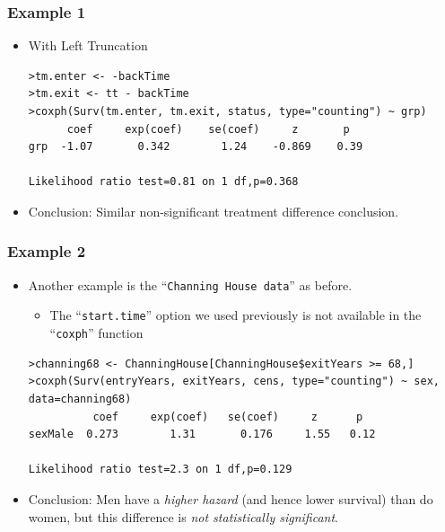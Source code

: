 \documentclass{beamer}
\newcommand{\empr}[1]{{\emph{\color{red}#1}}}
\begin{document}
\pagebreak
\begin{frame}[fragile]
\frametitle{Example 1}
\begin{itemize}
\item With {\color{red}Left Truncation}
\begin{Verbatim}
>tm.enter <- -backTime 
>tm.exit <- tt - backTime
>coxph(Surv(tm.enter, tm.exit, status, type="counting") ~ grp)
      coef     exp(coef)    se(coef)     z       p 
grp  -1.07       0.342        1.24    -0.869    0.39
	
Likelihood ratio test=0.81 on 1 df,p=0.368
\end{Verbatim}
\item Conclusion: Similar non-significant treatment difference conclusion.
\end{itemize}
\end{frame}

\pagebreak
\begin{frame}[fragile]
\frametitle{Example 2}
\begin{itemize}
\item Another example is the ``\texttt{Channing House data}'' as before.
\begin{itemize}
\item The ``\texttt{start.time}'' option we used previously is not available in the  ``\texttt{coxph}'' function
\end{itemize}
\begin{Verbatim}
>channing68 <- ChanningHouse[ChanningHouse$exitYears >= 68,] 
>coxph(Surv(entryYears, exitYears, cens, type="counting") ~ sex,
data=channing68)
          coef     exp(coef)   se(coef)     z      p 
sexMale  0.273        1.31       0.176     1.55   0.12

Likelihood ratio test=2.3 on 1 df,p=0.129
\end{Verbatim}
\item Conclusion: Men have a \empr{higher hazard} (and hence lower survival) than do women, but this difference is \empr{not statistically significant}.
\end{itemize}
\end{frame}
\end{document}
